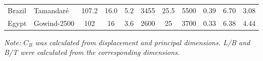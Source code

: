 \documentclass[12pt,a4paper,twoside]{report}
\begin{document}
\begin{table}[htbp]
\begin{tabular}{llccccccccc}
        Brazil &
        Tamandaré \cite{tamandare_brazil_navy} &
        107.2 & 16.0 & 5.2 & 3455 & 25.5 & 5500 & 0.39 & 6.70 & 3.08 \\

        Egypt &
        Gowind-2500 \cite{gowind_egypt_alexandria} &
        102 & 16 & 3.6 & 2600 & 25 & 3700 & 0.33 & 6.38 & 4.44 \\

        \bottomrule
    \end{tabular}

    \vspace{2mm}

    \footnotesize
    \textit{Note: $C_B$ was calculated from displacement and principal dimensions.
    L/B and B/T were calculated from the corresponding dimensions.}

\end{table}
\end{document}
